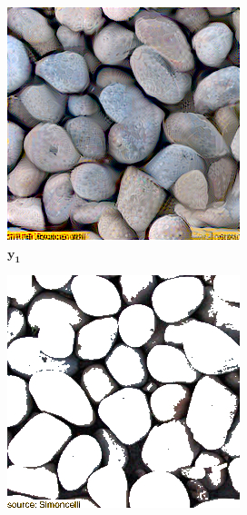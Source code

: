 \begin{figure}[ht]
    \centering    
    \begin{subfigure}{\textwidth}
        \centering
        \begin{subfigure}{0.2\textwidth}
            \centering
            \includegraphics[width=\textwidth]{images/01-pixels_vs_stats-pixels_target.jpg}
            \caption*{\(\bm{y_1}\)}
            \label{fig:intro_pixels_vs_stats-pixels_target}
        \end{subfigure}
        \hfill
        \begin{subfigure}{0.2\textwidth}
            \centering
            \includegraphics[width=\textwidth]{images/01-pixels_vs_stats-bg.jpg}

\end{subfigure}
\end{subfigure}
\end{figure}
